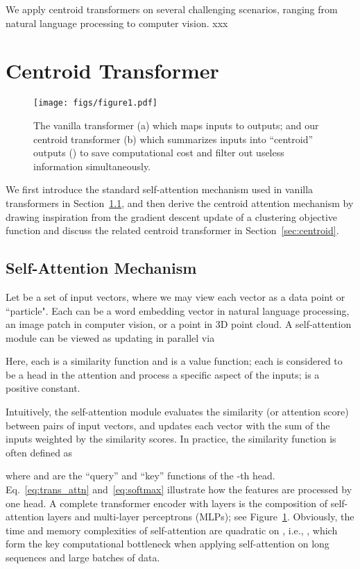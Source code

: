 \documentclass[english]{article}
\begin{document}
We apply centroid transformers on several challenging scenarios, ranging from natural language processing to computer vision. xxx
\fi


 
\section{Centroid Transformer}
\begin{figure}[t]
    \centering
    \texttt{[image: figs/figure1.pdf]}
    \vspace{-20pt}
    \caption{The vanilla transformer  (a)
    which maps  inputs to  outputs; 
    and our centroid transformer (b) which summarizes  inputs into  ``centroid'' outputs () to save computational cost and filter out useless information simultaneously. 
}
\label{fig:intro}
\end{figure}

We first introduce the standard self-attention mechanism used in vanilla transformers in Section~\ref{sec:selfattention}, 
and then derive the centroid attention mechanism by drawing inspiration from the gradient descent update of a clustering objective function 
and discuss the related centroid transformer in Section~\ref{sec:centroid}.

\subsection{Self-Attention Mechanism}\label{sec:selfattention}

Let  be a set of input vectors, where we may view each vector  as a data point or ``particle".
Each  can be a word embedding vector in natural language processing, an image patch in computer vision, or a point in 3D point cloud. A self-attention module can be viewed as updating  in parallel via 

Here, each  is a similarity function and  is a value function; each  is considered to be a head in the attention and process a specific aspect of the inputs;  is a positive constant.


Intuitively, 
the self-attention module evaluates the similarity (or attention score) between pairs of input vectors,  and updates each vector with the sum of the inputs weighted by the similarity scores.  In practice, the similarity function is often defined as 

where  and  are the ``query'' and ``key'' functions of the -th head. 
Eq.~\eqref{eq:trans_attn} and~\eqref{eq:softmax} illustrate how the features are processed by one head. 
A complete transformer encoder with  layers is the composition of self-attention layers and multi-layer perceptrons (MLPs); see Figure~\ref{fig:intro}. 
Obviously, the time and memory complexities 
 of self-attention are quadratic on , i.e., , which form the key computational bottleneck when applying self-attention on long sequences and large batches of data. 
\end{document}
